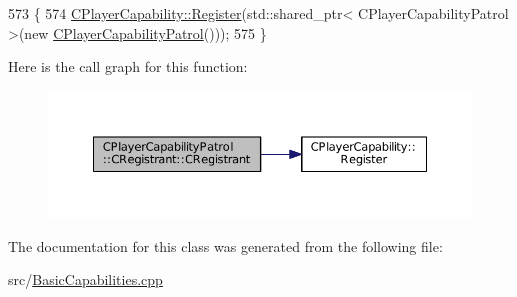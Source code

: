\begin{DoxyCode}
573                                                \{
574     \hyperlink{classCPlayerCapability_a7e298018dcde2684451add3cfff065f7}{CPlayerCapability::Register}(std::shared\_ptr< CPlayerCapabilityPatrol >(\textcolor{keyword}{new} 
      \hyperlink{classCPlayerCapabilityPatrol_a9c8653e6b0509a753d0b084f3988953b}{CPlayerCapabilityPatrol}()));   
575 \}
\end{DoxyCode}
Here is the call graph for this function\+:
\nopagebreak
\begin{figure}[H]
\begin{center}
\leavevmode
\includegraphics[width=350pt]{classCPlayerCapabilityPatrol_1_1CRegistrant_a30363f71e5aeed45f3953729b07829ac_cgraph}
\end{center}
\end{figure}


The documentation for this class was generated from the following file\+:\begin{DoxyCompactItemize}
\item 
src/\hyperlink{BasicCapabilities_8cpp}{Basic\+Capabilities.\+cpp}\end{DoxyCompactItemize}
